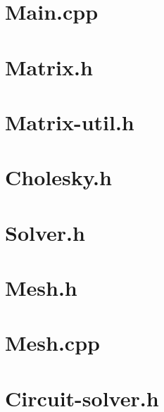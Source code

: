 \documentclass[journal,hidelinks]{IEEEtran}
\begin{document}


\newpage
\onecolumn

\begin{appendices}

\section{Main.cpp}
\label{sec:main}

\newpage

\section{Matrix.h}
\label{sec:matrix}

\newpage

\section{Matrix-util.h}
\label{sec:matrix-util}

\newpage

\section{Cholesky.h}
\label{sec:cholesky}

\newpage

\section{Solver.h}
\label{sec:solver}

\newpage

\section{Mesh.h}
\label{sec:mesh-h}

\newpage

\section{Mesh.cpp}
\label{sec:mesh-cpp}

\newpage

\section{Circuit-solver.h}
\label{sec:circuit-solver-h}

\newpage


\end{appendices}
\end{document}
